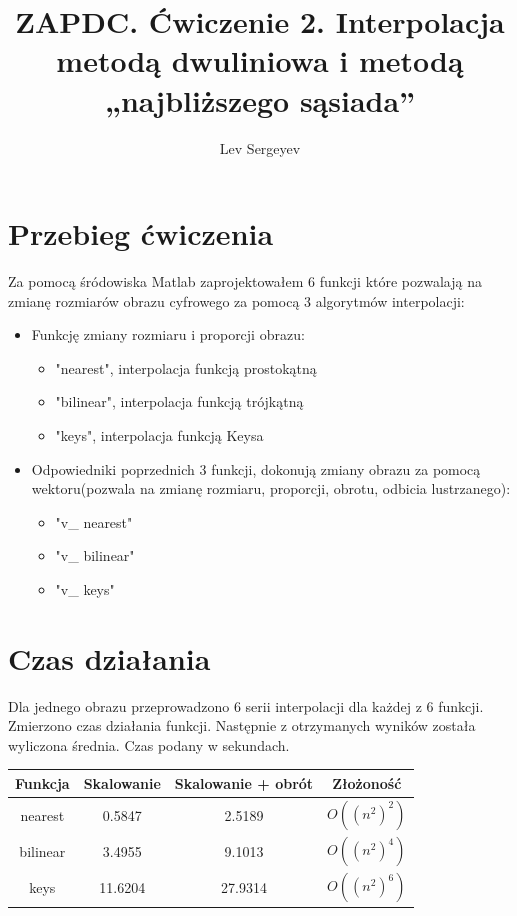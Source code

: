 \documentclass{article}
\author{Lev Sergeyev}
\title{ZAPDC. Ćwiczenie 2. Interpolacja metodą dwuliniowa i metodą „najbliższego sąsiada”}
\date{ }
\begin{document}
\maketitle


\section{Przebieg ćwiczenia}
Za pomocą śródowiska Matlab zaprojektowałem 6 funkcji które pozwalają na zmianę rozmiarów obrazu cyfrowego za pomocą 3 algorytmów interpolacji:
\begin{itemize}
    \item Funkcję zmiany rozmiaru i proporcji obrazu:
	\begin{itemize}
		\item "nearest", interpolacja funkcją prostokątną
		\item "bilinear", interpolacja funkcją trójkątną
		\item "keys", interpolacja funkcją Keysa
	\end{itemize}
    \item Odpowiedniki poprzednich 3 funkcji, dokonują zmiany obrazu za pomocą wektoru(pozwala na zmianę rozmiaru, proporcji, obrotu, odbicia lustrzanego):
	\begin{itemize}
		\item "v\_ nearest"
		\item "v\_ bilinear"
		\item "v\_ keys"
	\end{itemize}
\end{itemize}

\section{Czas działania}
Dla jednego obrazu przeprowadzono 6 serii interpolacji dla każdej z 6 funkcji. Zmierzono czas działania funkcji. Następnie z otrzymanych wyników została wyliczona średnia. Czas podany w sekundach.
\begin{center}
    \begin{tabular}{ | c | c | c | c |}
    \hline
    Funkcja &  Skalowanie & Skalowanie + obrót  & Złożoność \\ \hline

     nearest  & 0.5847 & 2.5189 & \( O( (n^2) ^2 ) \)
    \\ \hline


     bilinear  & 3.4955 & 9.1013 & \( O( (n^2) ^4 ) \)
    \\ \hline
    
    
    
     keys & 11.6204 & 27.9314 & \( O( (n^2) ^6 ) \)
    \\ \hline

    \end{tabular}
\end{center}
\end{document}
